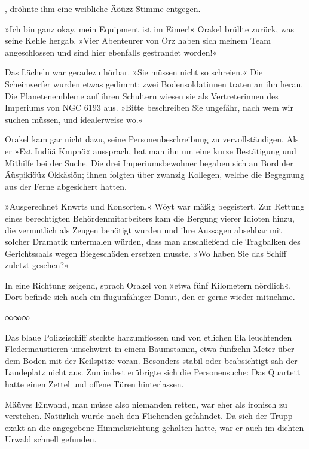 , dröhnte ihm eine weibliche Äöüzz-Stimme entgegen.

»Ich bin ganz okay, mein Equipment ist im Eimer!« Orakel brüllte zurück, was seine Kehle hergab. »Vier Abenteurer von Örz haben sich meinem Team angeschlossen und sind hier ebenfalls gestrandet worden!«

Das Lächeln war geradezu hörbar. »Sie müssen nicht so schreien.« Die Scheinwerfer wurden etwas gedimmt; zwei Bodensoldatinnen traten an ihn heran. Die Planetenembleme auf ihren Schultern wiesen sie als Vertreterinnen des Imperiums von NGC 6193 aus. »Bitte beschreiben Sie ungefähr, nach wem wir suchen müssen, und idealerweise wo.«

Orakel kam gar nicht dazu, seine Personenbeschreibung zu vervollständigen. Als er »Ezt Indüä Kmpnö« aussprach, bat man ihn um eine kurze Bestätigung und Mithilfe bei der Suche. Die drei Imperiumsbewohner begaben sich an Bord der Äüspikiöüz Ökkäsiön; ihnen folgten über zwanzig Kollegen, welche die Begegnung aus der Ferne abgesichert hatten.

»Ausgerechnet Knwrts und Konsorten.« Wöyt war mäßig begeistert. Zur Rettung eines berechtigten Behördenmitarbeiters kam die Bergung vierer Idioten hinzu, die vermutlich als Zeugen benötigt wurden und ihre Aussagen absehbar mit solcher Dramatik untermalen würden, dass man anschließend die Tragbalken des Gerichtssaals wegen Biegeschäden ersetzen musste. »Wo haben Sie das Schiff zuletzt gesehen?«

In eine Richtung zeigend, sprach Orakel von »etwa fünf Kilometern nördlich«. Dort befinde sich auch ein flugunfähiger Donut, den er gerne wieder mitnehme.

\begin{center}
∞∞∞
\end{center}

Das blaue Polizeischiff steckte harzumflossen und von etlichen lila leuchtenden Fledermaustieren umschwirrt in einem Baumstamm, etwa fünfzehn Meter über dem Boden mit der Keilspitze voran. Besonders stabil oder beabsichtigt sah der Landeplatz nicht aus. Zumindest erübrigte sich die Personensuche: Das Quartett hatte einen Zettel und offene Türen hinterlassen.


Mäüves Einwand, man müsse also niemanden retten, war eher als ironisch zu verstehen. Natürlich wurde nach den Fliehenden gefahndet. Da sich der Trupp exakt an die angegebene Himmelsrichtung gehalten hatte, war er auch im dichten Urwald schnell gefunden.

